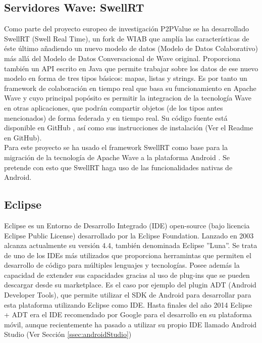     \subsection{Servidores Wave: SwellRT}\label{sssec:swellRT}
    
    Como parte del proyecto europeo de investigación P2PValue \cite{ref:p2pvalue} se ha desarrollado SwellRT (Swell Real Time), un fork de WIAB que amplía las características de éste último añadiendo un nuevo modelo de datos (Modelo de Datos Colaborativo) más allá del Modelo de Datos Conversacional de Wave original. Proporciona también un API escrito en Java que permite trabajar sobre los datos de ese nuevo modelo en forma de tres tipos básicos: mapas, listas y strings. Es por tanto un framework de colaboración en tiempo real que basa su funcionamiento en Apache Wave y cuyo principal popósito es permitir la integracion de la tecnología Wave en otras aplicaciones, que podrán compartir objetos (de los tipos antes mencionados) de forma federada y en tiempo real. Su código fuente está disponible en GitHub \cite{ref:swellRT_github}, así como sus instrucciones de instalación (Ver el Readme en GitHub).\\[.2cm]

    Para este proyecto se ha usado el framework SwellRT como base para la migración de la tecnología de Apache Wave a la plataforma Android \cite{ref:android_platform}. Se pretende con esto que SwellRT haga uso de las funcionalidades nativas de Android.
    
    \subsection{Eclipse}\label{ssec:eclipse} 
    
	Eclipse \cite{ref:eclipse} es un Entorno de Desarrollo Integrado (IDE) open-source (bajo licencia Eclipse Public License) desarrollado por la Eclipse Foundation. Lanzado en 2003 alcanza actualmente su versión 4.4, también denominada Eclipse ''Luna''. Se trata de uno de los IDEs más utilizados que proporciona herramintas que permiten el desarrollo de código para múltiples lenguajes y tecnologías. Posee además la capacidad de extender sus capacidades gracias al uso de plug-ins que se pueden descargar desde su marketplace. Es el caso por ejemplo del plugin ADT (Android Developer Tools), que permite utilizar el SDK de Android para desarrollar para esta plataforma utilizando Eclipse como IDE. Hasta finales del año 2014 Eclipse + ADT era el IDE recomendado por Google para el desarrollo en su plataforma móvil, aunque recientemente ha pasado a utilizar su propio IDE llamado Android Studio (Ver Sección \ref{ssec:androidStudio})
	
